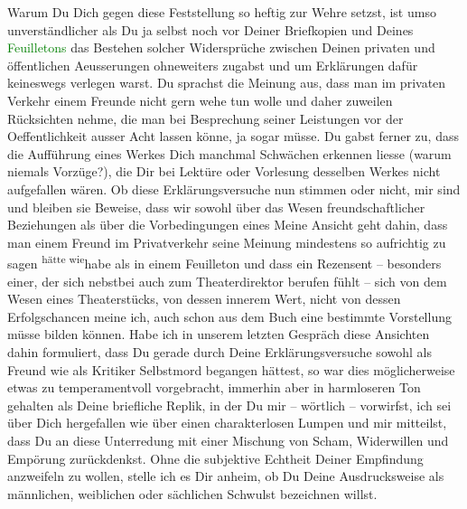 \pstart
           Warum Du Dich gegen diese Feststellung so heftig zur Wehre setzst, ist umso
               unverständlicher als Du ja selbst noch vor \label{T_L03521-1v}\label{T_L03521-1h} Deiner Briefkopien und Deines
                  \textcolor{green}{Feuilletons}{}\ledrightnote{{$\rightarrow$}\textcolor{green}{Berliner Theater. (»Lebendige Stunden« von Arthur Schnitzler.)}} das Bestehen
               solcher Widersprüche zwischen Deinen privaten und öffentlichen Aeusserungen
               ohneweiters zugabst und um Erklärungen dafür keineswegs verlegen warst. Du sprachst
               die Meinung aus, dass man im privaten Verkehr einem Freunde nicht gern wehe tun wolle
               und daher zuweilen Rücksichten nehme, die man bei Besprechung seiner Leistungen vor
               der Oeffentlichkeit ausser Acht lassen könne, ja sogar müsse. Du gabst ferner zu,
               dass die Aufführung eines Werkes Dich manchmal Schwächen erkennen liesse (warum
               niemals Vorzüge?), die Dir bei Lektüre oder Vorlesung desselben Werkes nicht
               aufgefallen wären. Ob diese Erklärungsversuche nun stimmen oder nicht, mir sind und
               bleiben sie Beweise, dass wir sowohl über das Wesen freundschaftlicher Beziehungen
               als über die Vorbedingungen eines \label{T_L03521-2v}\label{T_L03521-2h}{ }{\pb}Meine Ansicht geht dahin, dass man
               einem Freund im Privatverkehr seine Meinung mindestens so aufrichtig zu sagen \substVorne{}\textsuperscript{hätte wie}{\allowbreak}\substDazwischen{}habe als\substHinten{} in einem Feuilleton und dass ein Rezensent – besonders einer, der sich
               nebstbei auch zum Theaterdirektor berufen fühlt – sich von dem Wesen eines
               Theaterstücks, von dessen innerem Wert, nicht von dessen Erfolgschancen meine ich,
               auch schon aus dem Buch eine bestimmte Vorstellung müsse bilden können. Habe ich in
               unserem letzten Gespräch diese Ansichten dahin formuliert, dass Du gerade durch Deine
               Erklärungsversuche sowohl als Freund wie als Kritiker Selbstmord begangen hättest, so
               war dies möglicherweise  etwas zu temperamentvoll
               vorgebracht, immerhin aber in harmloseren Ton gehalten als Deine briefliche Replik,
               in der Du mir – wörtlich – vorwirfst, ich sei über Dich hergefallen wie über einen
               charakterlosen Lumpen und mir mitteilst, dass Du an diese Unterredung mit einer
               Mischung von Scham, Widerwillen und Empörung zurückdenkst. Ohne die subjektive
               Echtheit Deiner Empfindung anzweifeln zu wollen, stelle ich es Dir anheim, ob Du
               Deine Ausdrucksweise als männlichen, weiblichen oder sächlichen Schwulst bezeichnen
               willst.\pend
           
